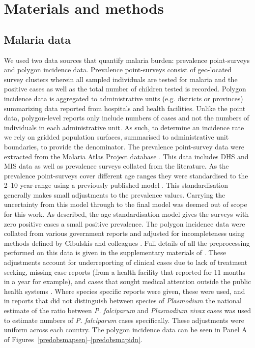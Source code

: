 \documentclass{statsoc}
\begin{document}
\section*{Materials and methods}


\subsection*{Malaria data}

We used two data sources that quantify malaria burden: prevalence point-surveys and polygon incidence data.
Prevalence point-surveys consist of geo-located survey clusters wherein all sampled individuals are tested for malaria and the positive cases as well as the total number of children tested is recorded. 
Polygon incidence data is aggregated to administrative units (e.g. districts or provinces) summarizing data reported from hospitals and health facilities. 
Unlike the point data, polygon-level reports only include numbers of cases and not the numbers of individuals in each administrative unit.  
As such, to determine an incidence rate we rely on gridded population surfaces, summarised to administrative unit boundaries, to provide the denominator. 
The prevalence point-survey data were extracted from the Malaria Atlas Project database \citep{bhatt2015effect, guerra2007assembling, pfeffer2018ma}. 
This data includes DHS and MIS data as well as prevalence surveys collated from the literature.
As the prevalence point-surveys cover different age ranges they were standardised to the 2--10 year-range using a previously published model \citep{smith2007standardizing}. 
This standardisation generally makes small adjustments to the prevalence values.
Carrying the uncertainty from this model through to the final model was deemed out of scope for this work.
As described, the age standardisation model gives the surveys with zero positive cases a small positive prevalence. 
The polygon incidence data were collated from various government reports and adjusted for incompleteness using methods defined by Cibulskis and colleagues \citep{cibulskis2011worldwide}.
Full details of all the preprocessing performed on this data is given in the supplementary materials of \cite{weiss2019mapping}. 
These adjustments account for underreporting of clinical cases due to lack of treatment seeking, missing case reports (from a health facility that reported for 11 months in a year for example), and cases that sought medical attention outside the public health systems \citep{battle2016treatment}. 
Where species specific reports were given, these were used, and in reports that did not distinguish between species of \emph{Plasmodium} the national estimate of the ratio between \emph{P. falciparum} and \emph{Plasmodium vivax} cases was used to estimate numbers of \emph{P. falciparum} cases specifically. 
These adjustments were uniform across each country. 
The polygon incidence data can be seen in Panel A of Figures~\ref{predobsmapsen}--\ref{predobsmapidn}.
\end{document}
